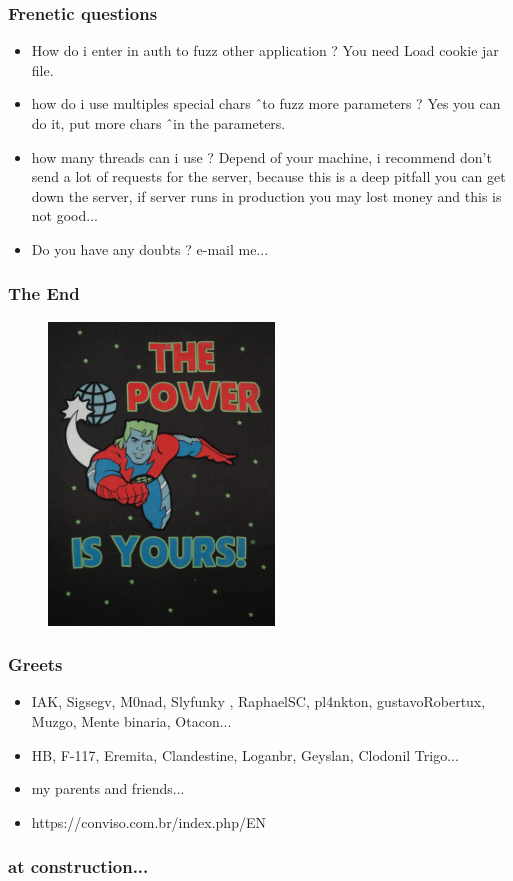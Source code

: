 \documentclass[serif,mathserif]{beamer}
\begin{document}
\begin{frame}
  \frametitle{Frenetic questions}
  \begin{itemize}
  \item How do i enter in auth to fuzz other application ? You need Load cookie jar file.
  \item how do i use multiples special chars \^ \ to fuzz more parameters ? Yes you can do it, put more chars \^ \ in the parameters.
  \item how many threads can i use ? Depend of your machine, i recommend don't send a lot of requests for the server, because this is a deep pitfall you can get down the server, if server runs in production you may lost money and this is not good...
  \item  Do you have any doubts ? e-mail me...
  \end{itemize}
\end{frame}

\begin{frame}
  \frametitle{The End}
  \begin{figure}[]    
    \centering
    \includegraphics[width=6cm]{images/letsgoplanet.jpg} 
  \end{figure}
\end{frame}




\begin{frame}
  \frametitle{Greets}
  \begin{itemize}
  \item IAK, Sigsegv, M0nad, Slyfunky , RaphaelSC, pl4nkton, gustavoRobertux, Muzgo, Mente binaria, Otacon...
  \item HB, F-117, Eremita, Clandestine, Loganbr, Geyslan, Clodonil Trigo...
  \item my parents and friends...
  \item https://conviso.com.br/index.php/EN
  \end{itemize}
\end{frame}

\begin{frame}
  \frametitle{at construction...}
\end{frame}
\end{document}
